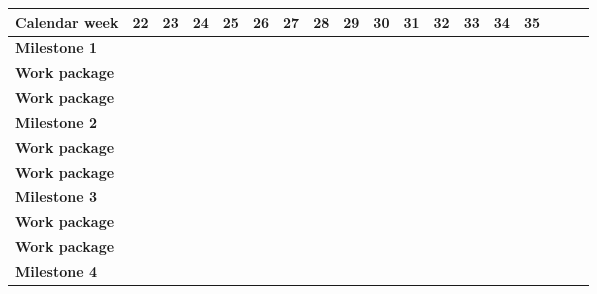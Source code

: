 \documentclass[lang=english,inputenc=utf8,fontsize=10pt]{ldvarticle}
\begin{document}
\begin{center}
\begin{footnotesize}
\setlength{\arrayrulewidth}{1,05pt}
\begin{tabular}[htb]{|m{}|p{.3cm}|p{.3cm}|p{.3cm}|p{.3cm}|p{.3cm}|p{.3cm}|p{.3cm}|p{.3cm}|p{.3cm}|p{.3cm}|p{.3cm}|p{.3cm}|p{.3cm}|p{.3cm}|p{.3cm}|p{.3cm}|p{.3cm}|}
	\hline
	\textbf{Calendar week}&\tiny\textbf{22}&\tiny\textbf{23}&\tiny\textbf{24}&\tiny\textbf{25}& \tiny \textbf{26} & \tiny \textbf{27} & \tiny \textbf{28} & \tiny \textbf{29} &  \tiny \textbf{30} &  \tiny \textbf{31} &  \tiny \textbf{32} &  \tiny \textbf{33}  &  \tiny \textbf{34} &  \tiny \textbf{35} \\
	\hline
	\hline
	\rowcolor{lightgray} \textbf{Milestone 1}& \cellcolor{red} & & & & & & & & & & & & &\\
	\hline
	\rowcolor{lightgray} \textbf{Work package}& \cellcolor{black} & \cellcolor{black} & \cellcolor{black} & & & & & & & & & & & \\
	\hline
	\rowcolor{lightgray} \textbf{Work package}& & & \cellcolor{black} & \cellcolor{black} & \cellcolor{black} & & & & & & & & &\\
	\hline
	\rowcolor{lightgray} \textbf{Milestone 2}& & & & & \cellcolor{red} & & & & & & & & &\\
	\hline
	\rowcolor{lightgray} \textbf{Work package}& & & & & \cellcolor{black} & \cellcolor{black} & & & & & & & & \\
	\hline
	\rowcolor{lightgray} \textbf{Work package}& & & & & & & \cellcolor{black} & \cellcolor{black} & \cellcolor{black} & \cellcolor{black} & & & &\\
	\hline
	\rowcolor{lightgray} \textbf{Milestone 3}& & & & & & & & & \cellcolor{red} & & & & &\\
	\hline
	\rowcolor{lightgray} \textbf{Work package}& & & & & & & & \cellcolor{black} & \cellcolor{black} & & &  & & \\
	\hline
	\rowcolor{lightgray} \textbf{Work package}& & & & & & & & & & & \cellcolor{black} & \cellcolor{black} & \cellcolor{black} & \cellcolor{black} \\
	\hline
	\rowcolor{lightgray} \textbf{Milestone 4}& & & & & & & & & & & & & & \cellcolor{red}\\
	\hline

\end{tabular}
\end{footnotesize}
\end{center}

\newpage
\end{document}
